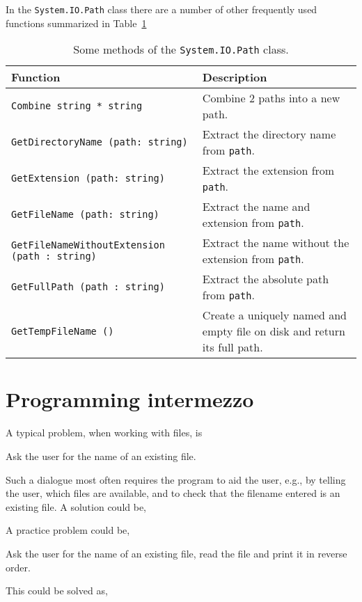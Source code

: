 In the \lstinline!System.IO.Path! class there are a number of other frequently used functions summarized in Table~\ref{tab:path}
\begin{table}
  \begin{center}
    \begin{tabularx}{\linewidth}{|l|X|}
      \hline
      Function & Description\\
      \hline
      \lstinline{Combine string * string} & Combine 2 paths into a new path.\\
      \hline
      \lstinline{GetDirectoryName (path: string)} & Extract the directory name from \lstinline{path}.\\
      \hline
      \lstinline{GetExtension (path: string)} & Extract the extension from \lstinline{path}.\\
      \hline
      \lstinline{GetFileName (path: string)} & Extract the name and extension from \lstinline{path}.\\
      \hline
      \lstinline{GetFileNameWithoutExtension (path : string)} & Extract the name without the extension from \lstinline{path}.\\
      \hline
      \lstinline{GetFullPath (path : string)} & Extract the absolute path from \lstinline{path}.\\
      \hline
      \lstinline{GetTempFileName ()} & Create a uniquely named and empty file on disk and return its full path.\\
      \hline
    \end{tabularx}
  \end{center}
  \caption{Some methods of the \lstinline!System.IO.Path! class.}
  \label{tab:path}
\end{table}

\section{Programming intermezzo}
A typical problem, when working with files, is
\begin{problem}
  Ask the user for the name of an existing file.
\end{problem}
Such a dialogue most often requires the program to aid the user, e.g., by telling the user, which files are available, and to check that the filename entered is an existing file. A solution could be,
%
%

A practice problem could be,
\begin{problem}
  Ask the user for the name of an existing file, read the file and print it in reverse order.
\end{problem}
This could be solved as,
%
%

